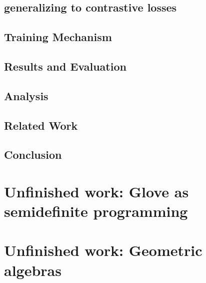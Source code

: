 \documentclass{book}
\begin{document}
\section{generalizing to contrastive losses}


\section{Training Mechanism}

\section{Results and Evaluation}

\section{Analysis}

\section{Related Work}

\section{Conclusion}

\chapter{Unfinished work: Glove as semidefinite programming}


\chapter{Unfinished work: Geometric algebras}



\end{document}
